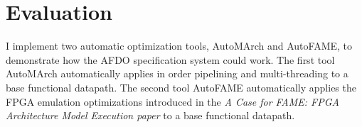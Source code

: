 \section{Evaluation}
I implement two automatic optimization tools, AutoMArch and AutoFAME, to demonstrate how the AFDO specification system could work. The first tool AutoMArch automatically applies in order pipelining and multi-threading to a base functional datapath. The second tool AutoFAME automatically applies the FPGA emulation optimizations introduced in the \textit{A Case for FAME: FPGA Architecture Model Execution paper} \cite{FAME:2010} to a base functional datapath.
